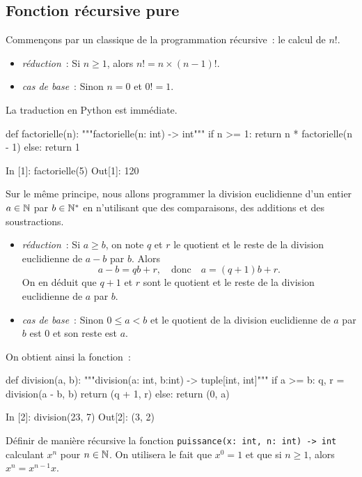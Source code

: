 \documentclass{magnolia}
\begin{document}
\subsection{Fonction récursive pure}

Commençons par un classique de la programmation récursive~: le calcul de $n!$.
\begin{itemize}
\item \emph{réduction}~: Si $n\geq 1$, alors $n! = n \times (n-1)!$.
\item \emph{cas de base}~: Sinon $n=0$ et $0!=1$.
\end{itemize}
La traduction en Python est immédiate.
\begin{pythoncodeline}
def factorielle(n):
    """factorielle(n: int) -> int"""
    if n >= 1:
        return n * factorielle(n - 1)
    else:
        return 1
\end{pythoncodeline}
\begin{pythoncode}
In [1]: factorielle(5)
Out[1]: 120
\end{pythoncode}

\vspace{2ex}
Sur le même principe, nous allons programmer la division euclidienne d'un entier
$a\in\mathbb{N}$ par $b\in{\mathbb{N}^*}$ en n'utilisant que des comparaisons, des additions et des
soustractions.
\begin{itemize}
\item \emph{réduction}~: Si $a\geq b$, on note $q$ et $r$
  le quotient et le reste de la division euclidienne de $a-b$ par $b$. Alors
  \[a-b=qb+r, \quad\text{donc}\quad a = (q+1)b+r.\]
  On en déduit que $q+1$ et $r$ sont le quotient et le reste de la division euclidienne de $a$
  par $b$.
\item \emph{cas de base}~: Sinon $0\leq a < b$ et le quotient de la division euclidienne
  de $a$ par $b$ est 0 et son reste est $a$.
\end{itemize}
On obtient ainsi la fonction~:
\begin{pythoncodeline}
def division(a, b):
    """division(a: int, b:int) -> tuple[int, int]"""
    if a >= b:
        q, r = division(a - b, b)
        return (q + 1, r)
    else:
        return (0, a)
\end{pythoncodeline}
\begin{pythoncode}
In [2]: division(23, 7)
Out[2]: (3, 2)
\end{pythoncode}

\begin{exoUnique}
\exo Définir de manière récursive la fonction \verb!puissance(x: int, n: int) -> int!
  calculant $x^n$ pour $n\in\mathbb{N}$. On utilisera le fait que $x^0=1$ et que si $n\geq 1$,
  alors $x^n= x^{n-1} x$.
\end{exoUnique}
\end{document}
